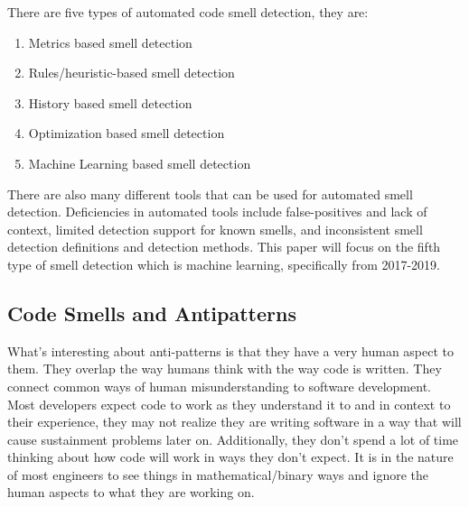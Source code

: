 \documentclass[conference]{IEEEtran}
\begin{document}
There are five types of automated code smell detection\cite{lafi_code_2019}, they are:
\begin{enumerate}
\item Metrics based smell detection
\item Rules/heuristic-based smell detection
\item History based smell detection
\item Optimization based smell detection
\item Machine Learning based smell detection
\end{enumerate}
There are also many different tools\cite{walter_code_2018} that can be used for automated smell detection.
Deficiencies in automated tools include false-positives and lack of context, limited detection support for known smells, and inconsistent smell detection definitions and detection methods\cite{sharma_detecting_2018}.
This paper will focus on the fifth type of smell detection which is machine learning, specifically from 2017-2019.

\subsection{Code Smells and Antipatterns}
What's interesting about anti-patterns is that they have a very human aspect to them. 
They overlap the way humans think with the way code is written. 
They connect common ways of human misunderstanding to software development. 
Most developers expect code to work as they understand it to and in context to their experience, they may not realize they are writing software in a way that will cause sustainment problems later on. 
Additionally, they don't spend a lot of time thinking about how code will work in ways they don't expect.
It is in the nature of most engineers to see things in mathematical/binary ways and ignore the human aspects to what they are working on.
\end{document}
